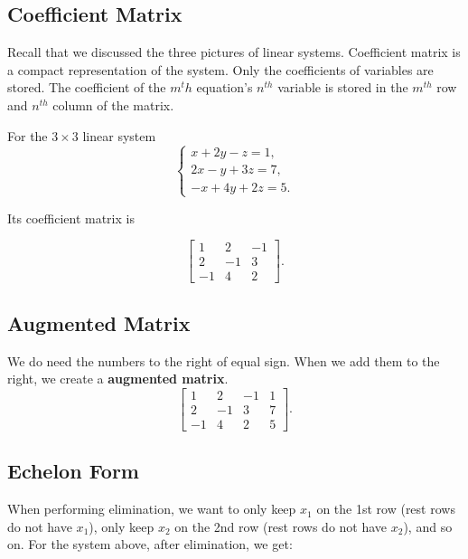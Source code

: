 \documentclass[11pt]{article}
\theoremstyle{definition}
\begin{document}
\vspace{0.5em}
\noindent{}

\subsection{Coefficient Matrix}
Recall that we discussed the three pictures of linear systems. Coefficient matrix is a compact representation of the system. Only the coefficients of variables are stored. The coefficient of the $m^th$ equation's $n^{th}$ variable is stored in the $m^{th}$ row and $n^{th}$ column of the matrix.

For the $3\times 3$ linear system
\[
\begin{cases}
    x + 2y - z = 1,\\
    2x - y + 3z = 7,\\
    -x + 4y + 2z = 5.
\end{cases}
\]

Its coefficient matrix is

\[
\begin{bmatrix}
    1 & 2 & -1\\
    2 & -1 & 3\\
    -1 & 4 & 2
\end{bmatrix}.
\]

\subsection{Augmented Matrix}
We do need the numbers to the right of equal sign. When we add them to the right, we create a \textbf{augmented matrix}. 
\[
\left[
\begin{array}{ccc|c}
    1 & 2 & -1 & 1\\
    2 & -1 & 3 & 7\\
    -1 & 4 & 2 & 5
\end{array}
\right].
\]

\subsection{Echelon Form}
When performing elimination, we want to only keep $x_1$ on the 1st row (rest rows do not have $x_1$), only keep $x_2$ on the 2nd row (rest rows do not have $x_2$), and so on. For the system above, after elimination, we get:
\end{document}
